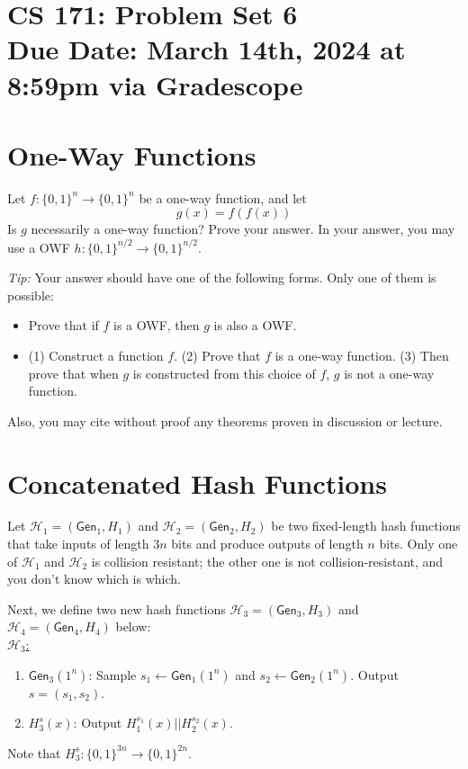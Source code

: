 \documentclass[11pt]{article}
\numberwithin{equation}{section}
\newcommand{\Gen}{\mathsf{Gen}}
\newcommand{\bin}{\{0,1\}}
\newcommand{\bit}{\bin}
\newcommand{\duedate}{March 14th, 2024 at 8:59pm via Gradescope}
\newcommand{\gen}{\mathsf{Gen}}
\begin{document}
\section*{CS 171: Problem Set 6\\ {\small Due Date: \duedate} }

\section{One-Way Functions}
Let $f:\bin^n \rightarrow \bin^n$ be a one-way function, and let
\[g(x) = f(f(x))\] 
Is $g$ necessarily a one-way function? Prove your answer. In your answer, you may use a OWF $h: \bit^{n/2} \to \bit^{n/2}$.\newline

\noindent \emph{Tip:} Your answer should have one of the following forms. Only one of them is possible:
\begin{itemize}
    \item Prove that if $f$ is a OWF, then $g$ is also a OWF.
    \item (1) Construct a function $f$. (2) Prove that $f$ is a one-way function. (3) Then prove that when $g$ is constructed from this choice of $f$, $g$ is not a one-way function.
\end{itemize}
Also, you may cite without proof any theorems proven in discussion or lecture.

\pagebreak

\section{Concatenated Hash Functions}
Let $\mathcal{H}_1 = (\gen_1, H_1)$ and $\mathcal{H}_2 = (\gen_2, H_2)$ be two fixed-length hash functions that take inputs of length ${3n}$ bits and produce outputs of length $n$ bits. Only one of $\mathcal{H}_1$ and $\mathcal{H}_2$ is collision resistant; the other one is not collision-resistant, and you don't know which is which. 

Next, we define two new hash functions $\mathcal{H}_3 = (\Gen_3, H_3)$ and $\mathcal{H}_4 = (\Gen_4, H_4)$ below: \\

\noindent\underline{$\mathcal{H}_3$:}
\begin{enumerate}
    \item $\Gen_3(1^n)$: Sample $s_1 \leftarrow \Gen_1(1^n)$ and $s_2 \leftarrow \Gen_2(1^n)$. Output $s=(s_1, s_2)$.
    \item $H_3^s(x)$: Output $H_1^{s_1}(x) || H_2^{s_2}(x)$.
\end{enumerate}
Note that $H_3^s: \bit^{3n} \to \bit^{2n}$.\\
\end{document}
